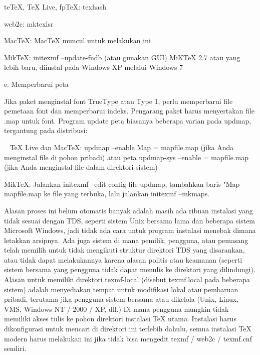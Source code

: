 teTeX, TeX Live, fpTeX: texhash \par
web2c: mktexlsr \par
MacTeX: MacTeX muncul untuk melakukan ini \par
MikTeX: initexmf --update-fndb (atau gunakan GUI)
MiKTeX 2.7 atau yang lebih baru, diinstal pada Windows XP melalui Windows 7 \par

\vspace{12pt} \par 
\noindent e. Memperbarui peta \par
Jika paket menginstal font TrueType atau Type 1, perlu memperbarui file pemetaan font dan memperbarui indeks. Pengarang paket harus menyertakan file .map untuk font. Program update peta biasanya beberapa varian pada updmap, tergantung pada distribusi: \par 
TeX Live dan MacTeX: updmap --enable Map = mapfile.map (jika Anda menginstal file di pohon pribadi) atau peta updmap-sys --enable = mapfile.map (jika Anda menginstal file dalam direktori sistem) \par

MikTeX: Jalankan initexmf --edit-config-file updmap, tambahkan baris "Map mapfile.map ke file yang terbuka, lalu jalankan initexmf --mkmaps. \par

\vspace{12pt}
Alasan proses ini belum otomatis banyak adalah masih ada ribuan instalasi yang tidak sesuai dengan TDS, seperti sistem Unix bersama lama dan beberapa sistem Microsoft Windows, jadi tidak ada cara untuk program instalasi menebak dimana letakkan arsipnya. Ada juga sistem di mana pemilik, pengguna, atau pemasang telah memilih untuk tidak mengikuti struktur direktori TDS yang disarankan, atau tidak dapat melakukannya karena alasan politis atau keamanan (seperti sistem bersama yang pengguna tidak dapat menulis ke direktori yang dilindungi). Alasan untuk memiliki direktori texmf-local (disebut texmf.local pada beberapa sistem) adalah menyediakan tempat untuk modifikasi lokal atau pembaruan pribadi, terutama jika pengguna sistem bersama atau dikelola (Unix, Linux, VMS, Windows NT / 2000 / XP, dll.) Di mana pengguna mungkin tidak memiliki akses tulis ke pohon direktori instalasi TeX utama. Instalasi harus dikonfigurasi untuk mencari di direktori ini terlebih dahulu, semua instalasi TeX modern harus melakukan ini jika tidak bisa mengedit texmf / web2c / texmf.cnf sendiri.\par

